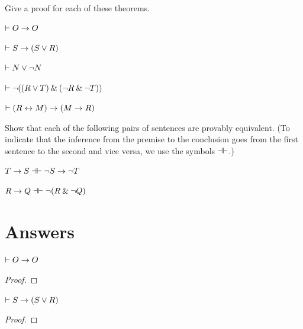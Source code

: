 \begin{small}

\problempart
Give a proof for each of these theorems.
\begin{earg}
\item $\vdash O \rightarrow O$\smallskip
\item $\vdash S \rightarrow (S \vee R)$\smallskip
\item $\vdash N \vee {\neg} N$\smallskip
\item $\vdash {\neg}((R \vee T) \mathbin{\&} ({\neg} R  \mathbin{\&} {\neg} T))$\smallskip
\item $\vdash (R \leftrightarrow M) \rightarrow (M \rightarrow R)$\smallskip
\end{earg}


\problempart
Show that each of the following pairs of sentences are provably equivalent. (To indicate that the inference from the premise to the conclusion goes from the first sentence to the second and vice versa, we use the symbols $\dashv\vdash$.)
\begin{earg}
\item $T\rightarrow S \dashv\vdash {\neg} S \rightarrow {\neg} T$
\item $R \rightarrow Q \dashv\vdash {\neg}(R \mathbin{\&} {\neg} Q)$
\end{earg}




\section{Answers}
\setcounter{ProbPart}{0}

\problempart


\begin{earg}

\noindent\begin{minipage}{0.99\textwidth}
\item $\vdash O \rightarrow O$
\begin{proof}
\open
	 \as{}
\close
{}
\end{proof}
\bigskip
\end{minipage}

\noindent\begin{minipage}{0.99\textwidth}
\item $\vdash S \rightarrow (S \vee R)$
\begin{proof}
\open
	 \as{}
	 
	 
\close
{}
\end{proof}
\medskip
\end{minipage}



\end{earg}
\end{small}
